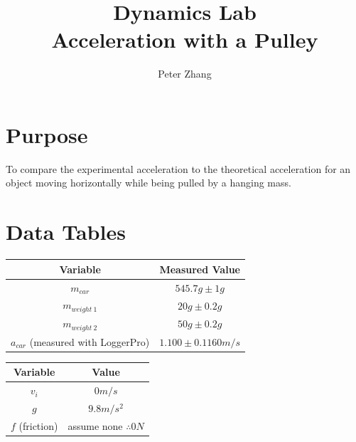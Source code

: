 \documentclass{article}
\title{Dynamics Lab\\Acceleration with a Pulley}
\author{Peter Zhang}
\begin{document}
\maketitle
\newpage
\tableofcontents
\newpage


\section{Purpose}
To compare the experimental acceleration to the theoretical acceleration for an object moving horizontally while being pulled by a hanging mass.

\section{Data Tables}

\begin{center}
	\begin{tabular}{|c|c|}
		\hline
		Variable & Measured Value\\
		\hline \hline
		$m_{car}$ & $545.7g\pm1g$\\
		\hline
		$m_{weight\ 1}$ & $20g\pm0.2g$\\
		\hline
		$m_{weight\ 2}$ & $50g\pm0.2g$\\
		\hline
		$a_{car}$ (measured with LoggerPro) & $1.100\pm0.1160m/s$\\
		\hline
	\end{tabular}
\end{center}

\begin{center}
	\begin{tabular}{|c|c|}
		\hline
		Variable & Value\\
		\hline \hline
		$v_{i}$ & $0m/s$\\
		\hline
		$g$ & $9.8m/s^2$\\
		\hline
		$f$ (friction) & assume none $\therefore{0N}$\\
		\hline
	\end{tabular}
\end{center}

\begin{figure}[H]
	\centering
\end{figure}
\end{document}
